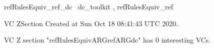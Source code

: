 \documentclass{article}
\begin{document}

\begin{zsection}	 \SECTION refRulesEquiv\_ref\_dc \parents~dc\_toolkit , refRulesEquiv\_ref
\end{zsection}

\newcommand{\appliesTo}{\zbinop{appliesTo}} 
\newcommand{\appliesToNofix}{\zpreop{appliesToNofix}} 

VC ZSection Created at Sun Oct 18 08:41:43 UTC 2020.



 VC Z section "refRulesEquivARGrefARGdc" has $0$ interesting VCs.



\end{document}
